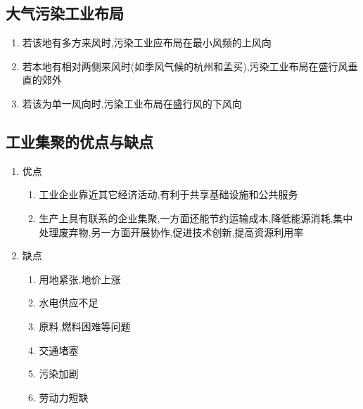 \documentclass[a4paper]{article}
\begin{document}
    \subsection{大气污染工业布局}
    \begin{enumerate}
        \item 若该地有多方来风时,污染工业应布局在最小风频的上风向 %
        \item 若本地有相对两侧来风时(如季风气候的杭州和孟买),污染工业布局在盛行风垂直的郊外
        \item 若该为单一风向时,污染工业布局在盛行风的下风向
    \end{enumerate}
    \subsection{工业集聚的优点与缺点}
    \begin{enumerate}
        \item 优点
        \begin{enumerate}
            \item 工业企业靠近其它经济活动,有利于共享基础设施和公共服务
            \item 生产上具有联系的企业集聚,一方面还能节约运输成本,降低能源消耗,集中处理废弃物,另一方面开展协作,促进技术创新,提高资源利用率
        \end{enumerate}
        \item 缺点
        \begin{enumerate}
            \item 用地紧张,地价上涨
            \item 水电供应不足
            \item 原料,燃料困难等问题
            \item 交通堵塞
            \item 污染加剧
            \item 劳动力短缺
        \end{enumerate}
    \end{enumerate}
\end{document}

